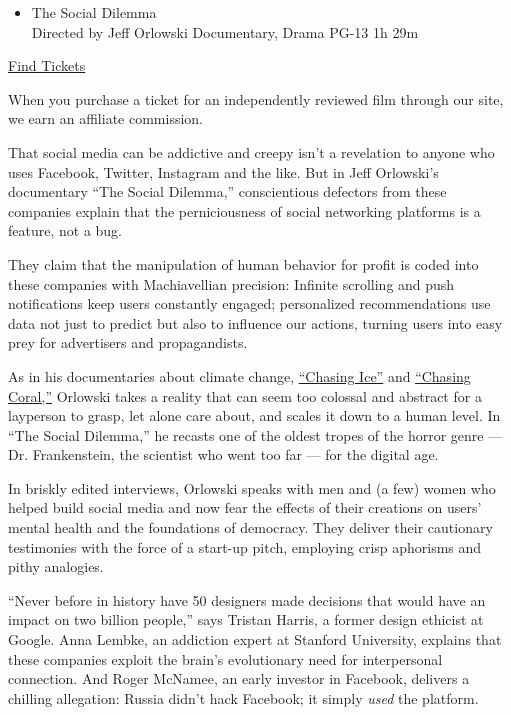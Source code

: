 \begin{itemize}
\tightlist
\item
  The Social Dilemma\\
  Directed by Jeff Orlowski Documentary, Drama PG-13 1h 29m
\end{itemize}

\href{https://www.imdb.com/showtimes/title/tt11464826?ref_=ref_ext_NYT}{Find
Tickets}

When you purchase a ticket for an independently reviewed film through
our site, we earn an affiliate commission.

That social media can be addictive and creepy isn't a revelation to
anyone who uses Facebook, Twitter, Instagram and the like. But in Jeff
Orlowski's documentary ``The Social Dilemma,'' conscientious defectors
from these companies explain that the perniciousness of social
networking platforms is a feature, not a bug.

They claim that the manipulation of human behavior for profit is coded
into these companies with Machiavellian precision: Infinite scrolling
and push notifications keep users constantly engaged; personalized
recommendations use data not just to predict but also to influence our
actions, turning users into easy prey for advertisers and propagandists.

As in his documentaries about climate change,
\href{https://www.nytimes3xbfgragh.onion/2012/11/09/movies/chasing-ice-documents-the-work-of-james-balog.html}{``Chasing
Ice''} and
\href{https://www.nytimes3xbfgragh.onion/2017/07/13/movies/chasing-coral-review.html}{``Chasing
Coral,''} Orlowski takes a reality that can seem too colossal and
abstract for a layperson to grasp, let alone care about, and scales it
down to a human level. In ``The Social Dilemma,'' he recasts one of the
oldest tropes of the horror genre --- Dr. Frankenstein, the scientist
who went too far --- for the digital age.

In briskly edited interviews, Orlowski speaks with men and (a few) women
who helped build social media and now fear the effects of their
creations on users' mental health and the foundations of democracy. They
deliver their cautionary testimonies with the force of a start-up pitch,
employing crisp aphorisms and pithy analogies.

``Never before in history have 50 designers made decisions that would
have an impact on two billion people,'' says Tristan Harris, a former
design ethicist at Google. Anna Lembke, an addiction expert at Stanford
University, explains that these companies exploit the brain's
evolutionary need for interpersonal connection. And Roger McNamee, an
early investor in Facebook, delivers a chilling allegation: Russia
didn't hack Facebook; it simply \emph{used} the platform.

